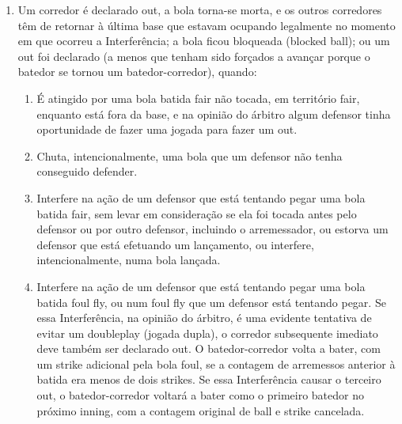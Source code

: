 \begin{multicols}{2}
\begin{enumerate}[label=\alph*)]
\begin{enumerate}[label=\roman*.]
\begin{enumerate}[label=\arabic*)]
				Uma base por \glspl{ball}, ou um terceiro \gls{strike} n\~ao agarrado em que o corredor \'e autorizado a correr, \'e tratado da mesma forma que uma bola batida. O batedor-corredor pode continuar avan\c{c}ando ap\'os ultrapassar a primeira base, e \'e autorizado a correr em dire\c{c}\~ao \`a segunda base, desde que ele n\~ao pare na primeira base. Se ele parar ap\'os ultrapassar a primeira base fazendo uma curva, ter\'a de retornar \`a base, ou continuar avan\c{c}ando \`a segunda base, imediatamente. 
			\end{enumerate}
			\item O batedor-corredor \'e declarado \gls{out} por ter interferido numa jogada no \gls{homeplate} para tentar evitar uma elimina\c{c}\~ao evidente de um corredor que est\'a avan\c{c}ando para \gls{home}. O corredor que est\'a avan\c{c}ando \'e declarado \gls{out} e os outros corredores t\^em de retornar \`a \'ultima base que estavam ocupando no momento do arremesso.
		\end{enumerate}
		\item Um corredor \'e declarado \gls{out}, a bola torna-se morta, e os outros corredores t\^em de retornar \`a \'ultima base que estavam ocupando legalmente no momento em que ocorreu a Interfer\^encia; a bola ficou bloqueada (\gls{blocked ball}); ou um \gls{out} foi declarado (a menos que tenham sido for\c{c}ados a avan\c{c}ar porque o batedor se tornou um batedor-corredor), quando: 
		\begin{enumerate}[label=\roman*.]
			\item \'E atingido por uma bola batida \gls{fair} n\~ao tocada, em territ\'orio \gls{fair}, enquanto est\'a fora da base, e na opini\~ao do \'arbitro algum defensor tinha oportunidade de fazer uma jogada para fazer um \gls{out}. 
			\item Chuta, intencionalmente, uma bola que um defensor n\~ao tenha conseguido defender. 
			\item Interfere na a\c{c}\~ao de um defensor que est\'a tentando pegar uma bola batida \gls{fair}, sem levar em considera\c{c}\~ao se ela foi tocada antes pelo defensor ou por outro defensor, incluindo o arremessador, ou estorva um defensor que est\'a efetuando um lan\c{c}amento, ou interfere, intencionalmente, numa bola lan\c{c}ada. 
			\item Interfere na a\c{c}\~ao de um defensor que est\'a tentando pegar uma bola batida \gls{foul fly}, ou num \gls{foul fly} que um defensor est\'a tentando pegar. Se essa Interfer\^encia, na opini\~ao do \'arbitro, \'e uma evidente tentativa de evitar um \gls{doubleplay} (jogada dupla), o corredor subsequente imediato deve tamb\'em ser declarado \gls{out}. O batedor-corredor volta a bater, com um \gls{strike} adicional pela bola \gls{foul}, se a contagem de arremessos anterior \`a batida era menos de dois \glspl{strike}. Se essa Interfer\^encia causar o terceiro \gls{out}, o batedor-corredor voltar\'a a bater como o primeiro batedor no pr\'oximo \gls{inning}, com a contagem original de \gls{ball} e \gls{strike} cancelada. 
			

\end{enumerate}
\end{enumerate}
\end{multicols}
